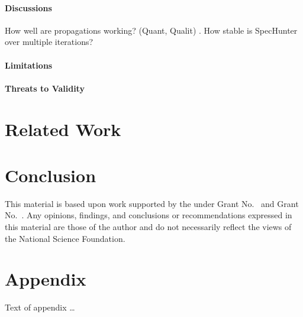 \documentclass[sigconf,review,anonymous]{acmart}\settopmatter{printfolios=true,printccs=false,printacmref=false}
\begin{document}

\paragraph{Discussions}
How well are propagations working? (Quant, Qualit) .
How stable is SpecHunter over multiple iterations?
\paragraph{Limitations}

\paragraph{Threats to Validity}


\section{Related Work}


\section{Conclusion}


\begin{acks}                            %
  This material is based upon work supported by the
   under Grant
  No.~ and Grant
  No.~. Any opinions, findings, and
  conclusions or recommendations expressed in this material are those
  of the author and do not necessarily reflect the views of the
  National Science Foundation.
\end{acks}


% 


\appendix
\section{Appendix}

Text of appendix \ldots
\end{document}
